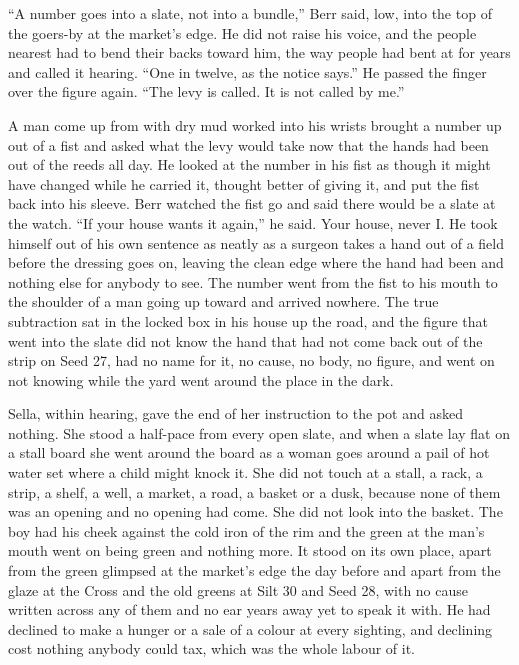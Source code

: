 “A number goes into a slate, not into a bundle,” Berr said, low, into the top of the goers-by at the market's edge. He did not raise his voice, and the people nearest had to bend their backs toward him, the way people had bent at  for years and called it hearing. “One in twelve, as the notice says.” He passed the finger over the figure again. “The levy is called. It is not called by me.”

A man come up from  with dry mud worked into his wrists brought a number up out of a fist and asked what the levy would take now that the hands had been out of the reeds all day. He looked at the number in his fist as though it might have changed while he carried it, thought better of giving it, and put the fist back into his sleeve. Berr watched the fist go and said there would be a slate at the watch. “If your house wants it again,” he said. Your house, never I. He took himself out of his own sentence as neatly as a surgeon takes a hand out of a field before the dressing goes on, leaving the clean edge where the hand had been and nothing else for anybody to see. The number went from the fist to his mouth to the shoulder of a man going up toward  and arrived nowhere. The true subtraction sat in the locked box in his house up the road, and the figure that went into the slate did not know the hand that had not come back out of the strip on Seed 27, had no name for it, no cause, no body, no figure, and went on not knowing while the yard went around the place in the dark.

Sella, within hearing, gave the end of her instruction to the pot and asked nothing. She stood a half-pace from every open slate, and when a slate lay flat on a stall board she went around the board as a woman goes around a pail of hot water set where a child might knock it. She did not touch  at a stall, a rack, a strip, a shelf, a well, a market, a road, a basket or a dusk, because none of them was an opening and no opening had come. She did not look into the basket. The boy had his cheek against the cold iron of the rim and the green at the man's mouth went on being green and nothing more. It stood on its own place, apart from the green glimpsed at the market's edge the day before and apart from the glaze at the Cross and the old greens at Silt 30 and Seed 28, with no cause written across any of them and no ear years away yet to speak it with. He had declined to make a hunger or a sale of a colour at every sighting, and declining cost nothing anybody could tax, which was the whole labour of it.


